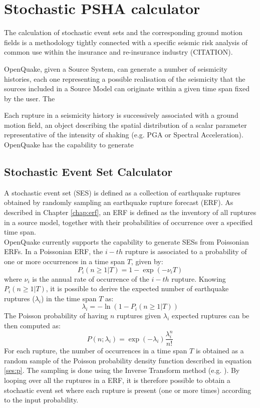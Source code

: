 \section{Stochastic PSHA calculator}
\label{chap:stochastic_psha}
%
The calculation of stochastic event sets  and the corresponding ground motion fields is a methodology tightly connected with a specific seismic risk analysis of common use within the insurance and re-insurance industry (CITATION). 

OpenQuake, given a Source System, can generate a number of seismicity histories, each one representing a possible realisation of the seismicity that the sources included in a Source Model can originate within a given time span fixed by the user.
% 
The 

Each rupture in a seismicity history is successively associated with a ground motion field, an object describing the spatial distribution of a scalar parameter representative of the intensity of shaking (e.g. PGA or Spectral Acceleration). OpenQuake has the capability to generate 
%
\subsection{Stochastic Event Set Calculator}
A stochastic event set (SES) is defined as a collection of earthquake ruptures obtained by randomly sampling an earthquake rupture forecast (ERF). As described in Chapter \ref{chap:erf}, an ERF is defined as the inventory of all ruptures in a source model, together with their probabilities of occurrence over a specified time span.\\
OpenQuake currently supports the capability to generate SESs from Poissonian ERFs. In a Poissonian ERF, the $i-th$ rupture is associated to a probability of one or more occurrences in a time span $T$, given by:
\begin{equation}
P_{i}(n\geq1|T) = 1 - \exp(-\nu_{i} T)
\end{equation} 
where $\nu_{i}$ is the annual rate of occurrence of the $i-th$ rupture. Knowing $P_{i}(n\geq1|T)$, it is possible to derive the expected number of earthquake ruptures ($\lambda_{i}$) in the time span $T$  as:
\begin{equation}
\lambda_{i} = - \ln(1 - P_{i}(n\geq1|T))
\end{equation} 
The Poisson probability of having $n$ ruptures given $\lambda_{i}$ expected ruptures can be then computed as:
\begin{equation}
P(n;\lambda_{i}) = \exp(-\lambda_{i})\frac{\lambda_{i}^{n}}{n!}
\label{ses:p}
\end{equation}
For each rupture, the number of occurrences in a time span $T$ is obtained as a random sample of the Poisson probability density function described in equation \ref{ses:p}. The sampling is done using the Inverse Transform method (e.g. \cite{martinez2002}). By looping over all the ruptures in a ERF, it is therefore possible to obtain a stochastic event set where each rupture is present (one or more times) according to the input probability.\\
%
